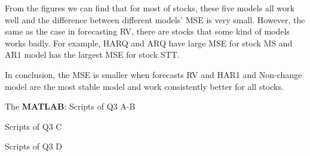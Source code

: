\documentclass[12pt,letterpaper]{article}
\begin{document}
\begin{enumerate}[label=\textbf{(\Alph*)}]
From the figures we can find that for most of stocks, these five models all work well and the difference between different models' MSE is very small. However, the same as the case in forecasting RV, there are stocks that some kind of models works badly. For example, HARQ and ARQ have large MSE for stock MS and AR1 model has the largest MSE for stock STT. 

In conclusion, the MSE is smaller when forecasts RV and HAR1 and Non-change model are the most stable model and work consistently better for all stocks.\\

\newpage

The \textbf{MATLAB}:
Scripts of Q3 A-B

Scripts of Q3 C

Scripts of Q3 D

\end{enumerate}
\end{document}
